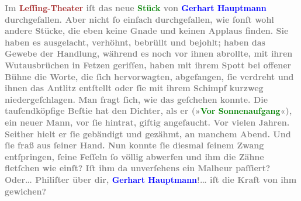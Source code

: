 \pstart
           \noindent{}\textcolor{gray}{\textbf{Im \textcolor{brown}{Leſſing-Theater}{}\ledrightnote{\textcolor{brown}{Lessing-Theater}} iſt das
                  neue \textcolor{green}{Stück}{}\ledrightnote{{$\rightarrow$}\textcolor{green}{Die Jungfern vom Bischofsberg. Lustspiel}} von \textcolor{blue}{Gerhart Hauptmann}{}\ledrightnote{\textcolor{blue}{Gerhart Hauptmann}} durchgefallen. Aber nicht
                  ſo einfach durchgefallen, wie ſonſt wohl andere Stücke, die eben keine Gnade und
                  keinen Applaus finden. Sie haben es ausgelacht, verhöhnt, bebrüllt und bejohlt;
                  haben das Gewebe der Handlung, während es noch vor ihnen abrollte, mit ihren
                  Wutausbrüchen in Fetzen geriſſen, haben mit ihrem Spott bei offener Bühne die
                  Worte, die ſich hervorwagten, abgefangen, ſie verdreht und ihnen das Antlitz
                  entſtellt oder ſie mit ihrem Schimpf kurzweg niedergeſchlagen. Man fragt ſich, wie
                  das geſchehen konnte. Die tauſendköpfige Beſtie hat den Dichter, als er (»\textcolor{green}{Vor Sonnenaufgang}{}\ledrightnote{\textcolor{green}{Vor Sonnenaufgang}}«), ein neuer Mann, vor ſie
                  hintrat, giftig angefaucht. Vor vielen Jahren. Seither hielt er ſie gebändigt und
                  gezähmt, an manchem Abend. Und ſie fraß aus ſeiner Hand. Nun konnte ſie diesmal
                  ſeinem Zwang entſpringen, ſeine Feſſeln ſo völlig abwerfen und ihm die Zähne
                  fletſchen wie einſt? Iſt ihm da unverſehens ein Malheur paſſiert? Oder{\dots} Philiſter über dir, \textcolor{blue}{Gerhart Hauptmann}{}\ledrightnote{\textcolor{blue}{Gerhart Hauptmann}}!{\dots} iſt die Kraft von ihm
                  gewichen?}}\pend
           {\bigskip}
\pstart
